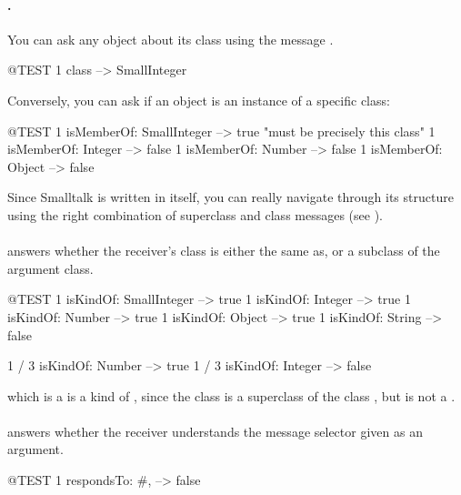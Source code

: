 \documentclass[a4paper,10pt,twoside]{book}
\begin{document}
\paragraph{.}
You can ask any object about its class using the message .
\begin{code}{@TEST}
1 class --> SmallInteger
\end{code}

Conversely, you can ask if an object is an instance of a specific class:
\begin{code}{@TEST}
1 isMemberOf: SmallInteger --> true    "must be precisely this class"
1 isMemberOf: Integer          --> false
1 isMemberOf: Number        --> false
1 isMemberOf: Object           --> false
\end{code}

Since Smalltalk is written in itself, you can really navigate through its structure using the right combination of superclass and class messages (see ). 

\paragraph{}
 answers whether the receiver's class is either the same as, or a subclass of the argument class.

\begin{code}{@TEST}
1 isKindOf: SmallInteger --> true
1 isKindOf: Integer          --> true
1 isKindOf: Number         --> true
1 isKindOf: Object           --> true
1 isKindOf: String            --> false

1 / 3 isKindOf: Number      --> true
1 / 3 isKindOf: Integer        --> false
\end{code}

 which is a  is a kind of , since the class  is a superclass of the class , but  is not a .

\paragraph{}
 answers whether the receiver understands the message selector given as an argument.

\begin{code}{@TEST}
1 respondsTo: #, --> false
\end{code}
\end{document}
